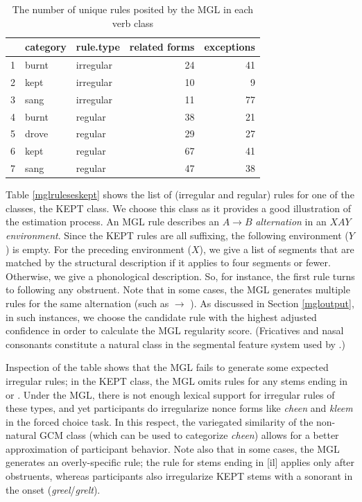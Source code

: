 \documentclass[12pt]{article}
\begin{document}
\begin{table}[ht]
\centering
\begin{tabular}{rllrr}
  \hline
 & category & rule.type & related forms & exceptions \\ 
  \hline
1 & burnt & irregular &  24 &  41 \\ 
  2 & kept & irregular &  10 &   9 \\ 
  3 & sang & irregular &  11 &  77 \\ 
  4 & burnt & regular &  38 &  21 \\ 
  5 & drove & regular &  29 &  27 \\ 
  6 & kept & regular &  67 &  41 \\ 
  7 & sang & regular &  47 &  38 \\ 
   \hline
\end{tabular}
\caption{The number of unique rules posited by the MGL in each verb class} 
\label{mglruleses}
\end{table}
Table \ref{mglruleseskept} shows the list of (irregular and regular) rules for one of the classes, the KEPT class. We choose this class as it provides a good illustration of the estimation process. An MGL rule describes an $A \rightarrow{} B$ {\em alternation} in an $XAY$ {\em environment}. Since the KEPT rules are all suffixing, the following environment ($Y$) is empty. For the preceding environment ($X$), we give a list of segments that are matched by the structural description if it applies to four segments or fewer. Otherwise, we give a phonological description. So, for instance, the first rule turns \textipa{[il]} to \textipa{[Elt]} following any obstruent. Note that in some cases, the MGL generates multiple rules for the same alternation (such as  $\rightarrow{}$ ). As discussed in Section \ref{mgloutput}, in such instances, we choose the candidate rule with the highest adjusted confidence in order to calculate the MGL regularity score. (Fricatives and nasal consonants constitute a natural class in the segmental feature system used by \citealt{albright2003rules}.) 

Inspection of the table shows that the MGL fails to generate some expected irregular rules; in the KEPT class, the MGL omits rules for any stems ending in \textipa{[in]} or \textipa{[im]}. Under the MGL, there is not enough lexical support for irregular rules of these types, and yet participants do irregularize nonce forms like {\em cheen} and {\em kleem}  in the forced choice task. In this respect, the variegated similarity of the non-natural GCM class (which can be used to categorize {\em cheen}) allows for a better approximation of participant behavior. Note also that in some cases, the MGL generates an overly-specific rule; the rule for stems ending in [il] applies only after obstruents, whereas participants also irregularize KEPT stems with a sonorant in the onset ({\em greel}/{\em grelt}).    
\end{document}
